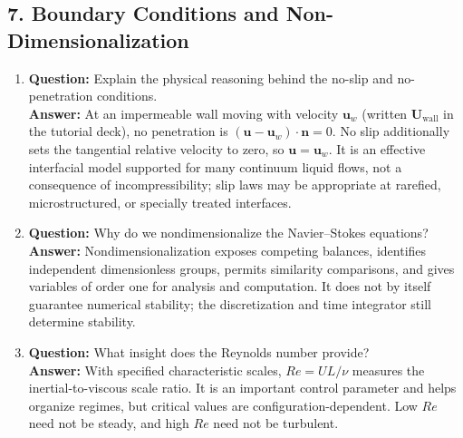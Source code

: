 \documentclass[12pt]{article}
\begin{document}
\subsection*{7. Boundary Conditions and Non-Dimensionalization}
\begin{enumerate}
\item \textbf{Question:} Explain the physical reasoning behind the no-slip and no-penetration conditions.\\
\textbf{Answer:} At an impermeable wall moving with velocity $\mathbf{u}_w$ (written $\mathbf{U}_{\mathrm{wall}}$ in the tutorial deck), no penetration is $(\mathbf{u}-\mathbf{u}_w)\cdot\mathbf{n}=0$. No slip additionally sets the tangential relative velocity to zero, so $\mathbf{u}=\mathbf{u}_w$. It is an effective interfacial model supported for many continuum liquid flows, not a consequence of incompressibility; slip laws may be appropriate at rarefied, microstructured, or specially treated interfaces.

\item \textbf{Question:} Why do we nondimensionalize the Navier--Stokes equations?\\
\textbf{Answer:} Nondimensionalization exposes competing balances, identifies independent dimensionless groups, permits similarity comparisons, and gives variables of order one for analysis and computation. It does not by itself guarantee numerical stability; the discretization and time integrator still determine stability.

\item \textbf{Question:} What insight does the Reynolds number provide?\\
\textbf{Answer:} With specified characteristic scales, $Re=UL/\nu$ measures the inertial-to-viscous scale ratio. It is an important control parameter and helps organize regimes, but critical values are configuration-dependent. Low $Re$ need not be steady, and high $Re$ need not be turbulent.
\end{enumerate}
\end{document}
